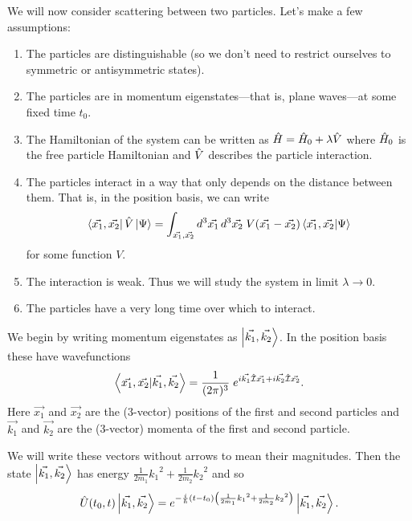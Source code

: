 
We will now consider scattering between two particles. Let's make a few assumptions:

\begin{enumerate}
\item The particles are distinguishable (so we don't need to restrict ourselves to symmetric or antisymmetric states).
\item The particles are in momentum eigenstates---that is, plane waves---at some fixed time \(t_0\).
\item The Hamiltonian of the system can be written as \(\hat{H} = \hat{H}_0 + \lambda \hat{V}\) where \(\hat{H}_0\) is the free particle Hamiltonian and \(\hat{V}\) describes the particle interaction.
\item The particles interact in a way that only depends on the distance between them. That is, in the position basis, we can write
\begin{equation}\label{eq.Vposbasis}
\left\langle\vec{x_1}, \vec{x_2}\right|\hat{V}\left|\Psi\right\rangle = \int_{\vec{x_1},\vec{x_2}} {d^3 \vec{x_1} \,d^3\vec{x_2}}\; V(\vec{x_1} - \vec{x_2}) \left\langle\vec{x_1}, \vec{x_2}|\Psi\right\rangle
\end{equation}
for some function \(V\).
\item
The interaction is weak. Thus we will study the system in limit \(\lambda \to 0\).
\item
The particles have a very long time over which to interact.
\end{enumerate}

We begin by writing momentum eigenstates as \(\left|\vec{k_1}, \vec{k_2}\right\rangle\). In the position basis these have wavefunctions
\begin{equation}\label{eq.momentuminpos}
\left\langle\vec{x_1}, \vec{x_2}|\vec{k_1}, \vec{k_2}\right\rangle = \frac{1}{(2\pi)^3}\;e^{i\vec{k_1}\hat{\mathcal{I}} \vec{x_1} + i\vec{k_2}\hat{\mathcal{I}} \vec{x_2}}.
\end{equation}
Here \(\vec{x_1}\) and \(\vec{x_2}\) are the (3-vector) positions of the first and second particles and \(\vec{k_1}\) and \(\vec{k_2}\) are the (3-vector) momenta of the first and second particle.

We will write these vectors without arrows to mean their magnitudes.
Then the state \(\left|\vec{k_1}, \vec{k_2}\right\rangle\) has energy \(\frac{1}{2m_1}{k_1}^2 + \frac{1}{2m_2}{k_2}^2\) and so
\begin{equation}
\label{eq.timeevonk}
\hat{U}(t_0, t) \left|\vec{k_1}, \vec{k_2}\right\rangle = e^{-\frac{i}{\hbar}\left(t-t_0\right)\left(\frac{1}{2m_1}{k_1}^2 + \frac{1}{2m_2}{k_2}^2\right)} \left|\vec{k_1}, \vec{k_2}\right\rangle.
\end{equation}

